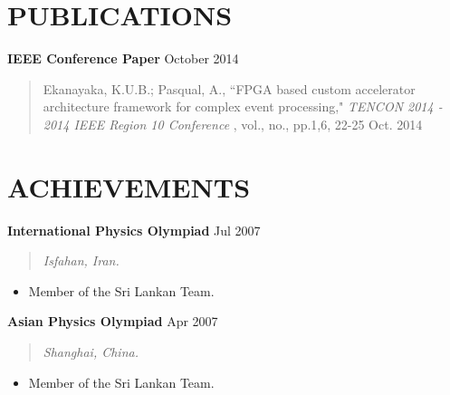 \documentclass[mm]{res} %
\begin{document}
\begin{resume}
\vspace {2 mm}
\section{PUBLICATIONS} 

\textbf{IEEE Conference Paper } \hfill October 2014
\begin{quote}
Ekanayaka, K.U.B.; Pasqual, A., ``FPGA based custom accelerator architecture framework for complex event processing," \emph{TENCON 2014 - 2014 IEEE Region 10 Conference} , vol., no., pp.1,6, 22-25 Oct. 2014
\end{quote}
 

\section{ACHIEVEMENTS} 

\textbf{International Physics Olympiad} \hfill Jul 2007
\begin{quote}
\emph{Isfahan, Iran.}
\end{quote}

\begin{itemize} \itemsep -1pt %
\item Member of the Sri Lankan Team.
\end{itemize}

\textbf{Asian Physics Olympiad} \hfill Apr 2007
\begin{quote}
\emph{Shanghai, China.}
\end{quote}

\begin{itemize} \itemsep -1pt %
\item Member of the Sri Lankan Team.
\end{itemize}




\end{resume}
\end{document}
